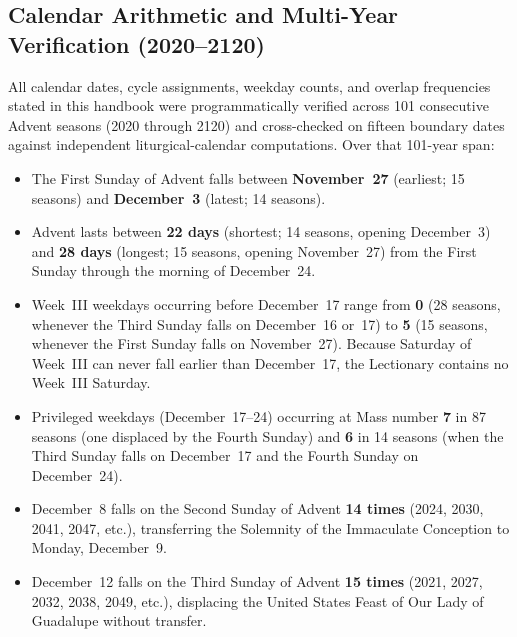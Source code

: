 \subsection{Calendar Arithmetic and Multi-Year Verification (2020--2120)}

All calendar dates, cycle assignments, weekday counts, and overlap frequencies stated in this handbook were programmatically verified across 101 consecutive Advent seasons (2020 through 2120) and cross-checked on fifteen boundary dates against independent liturgical-calendar computations. Over that 101-year span:

\begin{itemize}
  \item The First Sunday of Advent falls between \textbf{November~27} (earliest; 15 seasons) and \textbf{December~3} (latest; 14 seasons).
  \item Advent lasts between \textbf{22 days} (shortest; 14 seasons, opening December~3) and \textbf{28 days} (longest; 15 seasons, opening November~27) from the First Sunday through the morning of December~24.
  \item Week~III weekdays occurring before December~17 range from \textbf{0} (28 seasons, whenever the Third Sunday falls on December~16 or~17) to \textbf{5} (15 seasons, whenever the First Sunday falls on November~27). Because Saturday of Week~III can never fall earlier than December~17, the Lectionary contains no Week~III Saturday.
  \item Privileged weekdays (December~17--24) occurring at Mass number \textbf{7} in 87 seasons (one displaced by the Fourth Sunday) and \textbf{6} in 14 seasons (when the Third Sunday falls on December~17 and the Fourth Sunday on December~24).
  \item December~8 falls on the Second Sunday of Advent \textbf{14 times} (2024, 2030, 2041, 2047, etc.), transferring the Solemnity of the Immaculate Conception to Monday, December~9.
  \item December~12 falls on the Third Sunday of Advent \textbf{15 times} (2021, 2027, 2032, 2038, 2049, etc.), displacing the United States Feast of Our Lady of Guadalupe without transfer.
\end{itemize}

